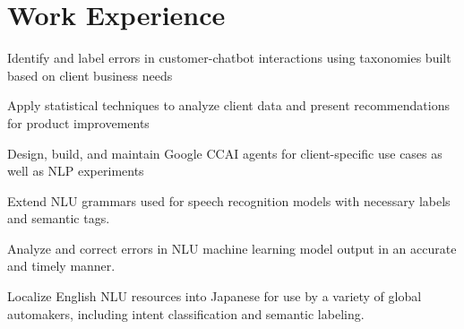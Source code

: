 \documentclass[letterpaper]{deedy-resume_sm} %
\begin{document}

\lastupdated %


\section{Work Experience}
\begin{tightitemize}
\item Identify and label errors in customer-chatbot interactions using taxonomies built based on client business needs
\item Apply statistical techniques to analyze client data and present recommendations for product improvements
\item Design, build, and maintain Google CCAI agents for client-specific use cases as well as NLP experiments
\end{tightitemize}
\begin{tightitemize}
\item Extend NLU grammars used for speech recognition models with necessary labels and semantic tags.
\item Analyze and correct errors in NLU machine learning model output in an accurate and timely manner.
\item Localize English NLU resources into Japanese for use by a variety of global automakers, including intent classification and semantic labeling.   
\end{tightitemize}
\end{document}
